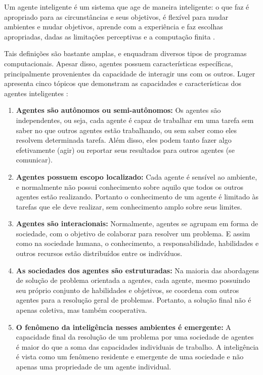 \begin{displayquote}
    Um agente inteligente é um sistema que age de maneira inteligente: o que faz é apropriado para as circunstâncias e seus objetivos, é flexível para mudar ambientes e mudar objetivos, aprende com a experiência e faz escolhas apropriadas, dadas as limitações perceptivas e a computação finita \cite{poole1998computational}.
\end{displayquote}

Tais definições são bastante amplas, e enquadram diversos tipos de programas computacionais. Apesar disso, agentes possuem características específicas, principalmente provenientes da capacidade de interagir uns com os outros. Luger apresenta cinco tópicos que demonstram as capacidades e características dos agentes inteligentes \cite{lugerBook6th}:

\begin{enumerate}
    \item \textbf{Agentes são autônomos ou semi-autônomos:} Os agentes são independentes, ou seja, cada agente é capaz de trabalhar em uma tarefa sem saber no que outros agentes estão trabalhando, ou sem saber como eles resolvem determinada tarefa. Além disso, eles podem tanto fazer algo efetivamente (agir) ou reportar seus resultados para outros agentes (se comunicar).
    \item \textbf{Agentes possuem escopo localizado:} Cada agente é sensível ao ambiente, e normalmente não possui conhecimento sobre aquilo que todos os outros agentes estão realizando. Portanto o conhecimento de um agente é limitado às tarefas que ele deve realizar, sem conhecimento amplo sobre seus limites.
    \item \textbf{Agentes são interacionais:} Normalmente, agentes se agrupam em forma de sociedade, com o objetivo de colaborar para resolver um problema. E assim como na sociedade humana, o conhecimento, a responsabilidade, habilidades e outros recursos estão distribuídos entre os indivíduos.
    \item \textbf{As sociedades dos agentes são estruturadas:} Na maioria das abordagens de solução de problema orientada a agentes, cada agente, mesmo possuindo seu próprio conjunto de habilidades e objetivos, se coordena com outros agentes para a resolução geral de problemas. Portanto, a solução final não é apenas coletiva, mas também cooperativa.
    \item \textbf{O fenômeno da inteligência nesses ambientes é emergente:} A capacidade final da resolução de um problema por uma sociedade de agentes é maior do que a soma das capacidades individuais de trabalho. A inteligência é vista como um fenômeno residente e emergente de uma sociedade e não apenas uma propriedade de um agente individual.
    
\end{enumerate}

